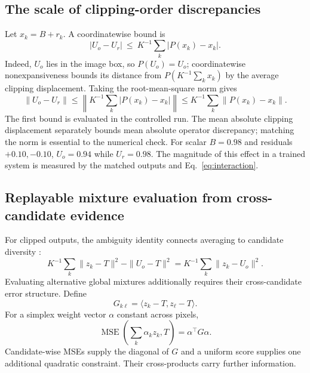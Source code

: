 \documentclass[12pt]{article}
\newcommand{\MSE}{\operatorname{MSE}}
\begin{document}
\subsection{The scale of clipping-order discrepancies}
Let $x_k=B+r_k$. A coordinatewise bound is
\begin{equation}
|U_o-U_r|\ \leq\ K^{-1}\sum_k|P(x_k)-x_k|. \label{eq:clipping-coordinate}
\end{equation}
Indeed, $U_o$ lies in the image box, so $P(U_o)=U_o$; coordinatewise nonexpansiveness bounds its distance from $P(K^{-1}\sum_kx_k)$ by the average clipping displacement. Taking the root-mean-square norm gives
\begin{equation}
\|U_o-U_r\|\leq\left\|K^{-1}\sum_k|P(x_k)-x_k|\right\|
\leq K^{-1}\sum_k\|P(x_k)-x_k\|. \label{eq:clipping-bound}
\end{equation}
The first bound is evaluated in the controlled run. The mean absolute clipping displacement separately bounds mean absolute operator discrepancy; matching the norm is essential to the numerical check. For scalar $B=0.98$ and residuals $+0.10,-0.10$, $U_o=0.94$ while $U_r=0.98$. The magnitude of this effect in a trained system is measured by the matched outputs and Eq.~\eqref{eq:interaction}.

\subsection{Replayable mixture evaluation from cross-candidate evidence}
For clipped outputs, the ambiguity identity connects averaging to candidate diversity \citep{krogh1994ensembles}:
\begin{equation}
K^{-1}\sum_k\|z_k-T\|^2-\|U_o-T\|^2
=K^{-1}\sum_k\|z_k-U_o\|^2. \label{eq:ambiguity}
\end{equation}
Evaluating alternative global mixtures additionally requires their cross-candidate error structure. Define
\begin{equation}
G_{k\ell}=\langle z_k-T,z_\ell-T\rangle.
\end{equation}
For a simplex weight vector $\alpha$ constant across pixels,
\begin{equation}
\MSE\!\left(\sum_k\alpha_kz_k,T\right)=\alpha^\top G\alpha. \label{eq:gram}
\end{equation}
Candidate-wise MSEs supply the diagonal of $G$ and a uniform score supplies one additional quadratic constraint. Their cross-products carry further information.
\end{document}
